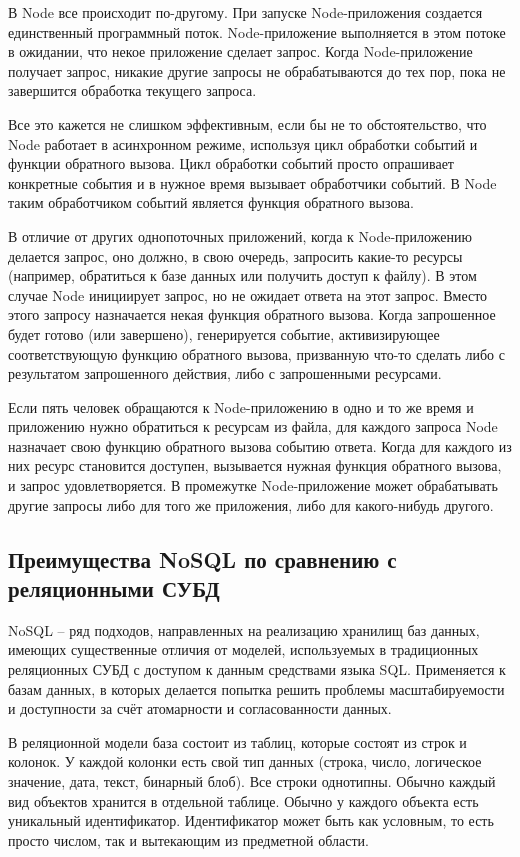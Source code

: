В Node все происходит по-другому. При запуске Node-приложения создается единственный программный поток. Node-приложение выполняется в этом потоке в ожидании, что некое приложение сделает запрос. Когда Node-приложение получает запрос, никакие другие запросы не обрабатываются до тех пор, пока не завершится обработка текущего запроса.

Все это кажется не слишком эффективным, если бы не то обстоятельство, что Node работает в асинхронном режиме, используя цикл обработки событий и функции обратного вызова. Цикл обработки событий просто опрашивает конкретные события и в нужное время вызывает обработчики событий. В Node таким обработчиком событий является функция обратного вызова.

В отличие от других однопоточных приложений, когда к Node-приложению делается запрос, оно должно, в свою очередь, запросить какие-то ресурсы (например, обратиться к базе данных или получить доступ к файлу). В этом случае Node инициирует запрос, но не ожидает ответа на этот запрос. Вместо этого запросу назначается некая функция обратного вызова. Когда запрошенное будет готово (или завершено), генерируется событие, активизирующее соответствующую функцию обратного вызова, призванную что-то сделать либо с результатом запрошенного действия, либо с запрошенными ресурсами.

Если пять человек обращаются к Node-приложению в одно и то же время и приложению нужно обратиться к ресурсам из файла, для каждого запроса Node назначает свою функцию обратного вызова событию ответа. Когда для каждого из них ресурс становится доступен, вызывается нужная функция обратного вызова, и запрос удовлетворяется. В промежутке Node-приложение может обрабатывать другие запросы либо для того же приложения, либо для какого-нибудь  другого.



\subsection{Преимущества NoSQL по сравнению с реляционными СУБД}
\label{sub:domain:k2_algo}
NoSQL – ряд подходов, направленных на реализацию хранилищ баз данных, имеющих существенные отличия от моделей, используемых в традиционных реляционных СУБД с доступом к данным средствами языка SQL. Применяется к базам данных, в которых делается попытка решить проблемы масштабируемости и доступности за счёт атомарности и согласованности данных.

В реляционной модели база состоит из таблиц, которые состоят из строк и колонок. У каждой колонки есть свой тип данных (строка, число, логическое значение, дата, текст, бинарный блоб). Все строки однотипны.
Обычно каждый вид объектов хранится в отдельной таблице. Обычно у каждого объекта есть уникальный идентификатор. Идентификатор может быть как условным, то есть просто числом, так и вытекающим из предметной области.

